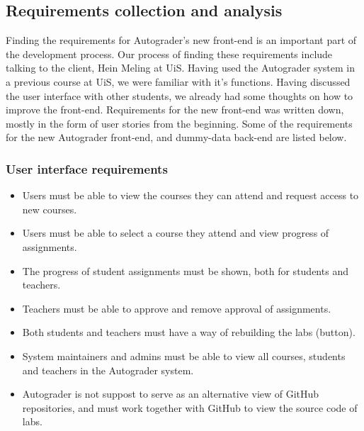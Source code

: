 \subsection{Requirements collection and analysis}
Finding the requirements for Autograder's new front-end is an important part of the development process. Our process of finding these requirements include talking to the client, Hein Meling at UiS. Having used the Autograder system in a previous course at UiS, we were familiar with it's functions. 
Having discussed the user interface with other students, we already had some thoughts on how to improve the front-end. Requirements for the new front-end was written down, mostly in the form of user stories from the beginning. Some of the requirements for the new Autograder front-end, and dummy-data back-end are listed below.

\subsubsection{User interface requirements}
\begin{itemize}
\item Users must be able to view the courses they can attend and request access to new courses.
\item Users must be able to select a course they attend and view progress of assignments.
\item The progress of student assignments must be shown, both for students and teachers.
\item Teachers must be able to approve and remove approval of assignments.
\item Both students and teachers must have a way of rebuilding the labs (button).
\item System maintainers and admins must be able to view all courses, students and teachers in the Autograder system.
\item Autograder is not suppost to serve as an alternative view of GitHub repositories, and must work together with GitHub to view the source code of labs.
\end{itemize}

